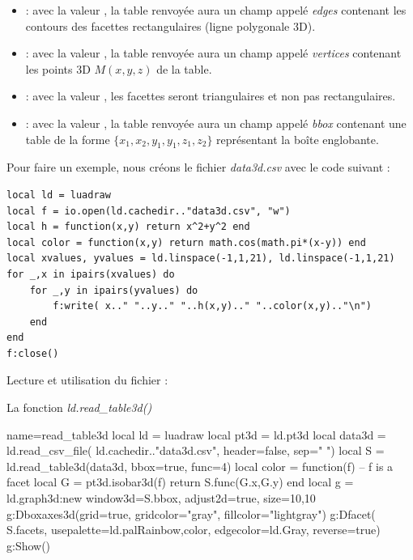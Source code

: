 \begin{itemize}
\begin{itemize}
        \item {} : avec la valeur \true, la table renvoyée aura un champ appelé \emph{edges} contenant les contours des facettes rectangulaires (ligne polygonale 3D).
        
        \item {} : avec la valeur \true, la table renvoyée aura un champ appelé \emph{vertices} contenant les points 3D $M(x,y,z)$ de la table.
        
        \item {} : avec la valeur \true, les facettes seront triangulaires et non pas rectangulaires.
               
        \item {} : avec la valeur \true, la table renvoyée aura un champ appelé \emph{bbox} contenant une table de la forme $\{x_1,x_2,y_1,y_1,z_1,z_2\}$ représentant la boîte englobante.
    \end{itemize}
\end{itemize}

Pour faire un exemple, nous créons le fichier \emph{data3d.csv} avec le code suivant :

\begin{verbatim}
local ld = luadraw
local f = io.open(ld.cachedir.."data3d.csv", "w")
local h = function(x,y) return x^2+y^2 end
local color = function(x,y) return math.cos(math.pi*(x-y)) end
local xvalues, yvalues = ld.linspace(-1,1,21), ld.linspace(-1,1,21)
for _,x in ipairs(xvalues) do
    for _,y in ipairs(yvalues) do
        f:write( x.." "..y.." "..h(x,y).." "..color(x,y).."\n")
    end
end
f:close()
\end{verbatim}

Lecture et utilisation du fichier :
\begin{demo}{La fonction \emph{ld.read\_table3d()}}
\begin{luadraw}{name=read_table3d}
local ld = luadraw
local pt3d  = ld.pt3d
local data3d = ld.read_csv_file( ld.cachedir.."data3d.csv", {header=false, sep=" "})
local S = ld.read_table3d(data3d, {bbox=true, func=4})
local color = function(f) -- f is a facet
    local G = pt3d.isobar3d(f)
    return S.func(G.x,G.y)
end
local g = ld.graph3d:new{ window3d=S.bbox, adjust2d=true, size={10,10} }
g:Dboxaxes3d({grid=true, gridcolor="gray", fillcolor="lightgray"})
g:Dfacet( S.facets, {usepalette={ld.palRainbow,color}, edgecolor=ld.Gray, reverse=true})
g:Show()
\end{luadraw}
\end{demo}



